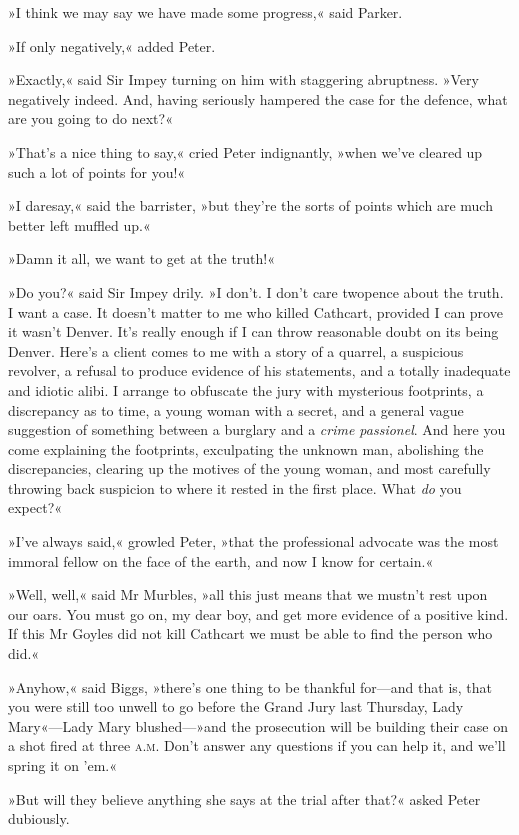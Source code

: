 »I think we may say we have made some progress,« said Parker.

»If only negatively,« added Peter.

»Exactly,« said Sir Impey turning on him with staggering abruptness.  »Very negatively indeed. And, having seriously hampered the case for the defence, what are you going to do next?«

»That's a nice thing to say,« cried Peter indignantly, »when we've cleared up such a lot of points for you!«

»I daresay,« said the barrister, »but they're the sorts of points which are much better left muffled up.«

»Damn it all, we want to get at the truth!«

»Do you?« said Sir Impey drily. »I don't. I don't care twopence about the truth. I want a case. It doesn't matter to me who killed Cathcart, provided I can prove it wasn't Denver. It's really enough if I can throw reasonable doubt on its being Denver. Here's a client comes to me with a story of a quarrel, a suspicious revolver, a refusal to produce evidence of his statements, and a totally inadequate and idiotic alibi. I arrange to obfuscate the jury with mysterious footprints, a discrepancy as to time, a young woman with a secret, and a general vague suggestion of something between a burglary and a \textit{crime passionel}. And here you come explaining the footprints, exculpating the unknown man, abolishing the discrepancies, clearing up the motives of the young woman, and most carefully throwing back suspicion to where it rested in the first place. What \textit{do} you expect?«

»I've always said,« growled Peter, »that the professional advocate was the most immoral fellow on the face of the earth, and now I know for certain.«

»Well, well,« said Mr Murbles, »all this just means that we mustn't rest upon our oars. You must go on, my dear boy, and get more evidence of a positive kind. If this Mr Goyles did not kill Cathcart we must be able to find the person who did.«

»Anyhow,« said Biggs, »there's one thing to be thankful for—and that is, that you were still too unwell to go before the Grand Jury last Thursday, Lady Mary«—Lady Mary blushed—»and the prosecution will be building their case on a shot fired at three \textsc{a.m.} Don't answer any questions if you can help it, and we'll spring it on 'em.«

»But will they believe anything she says at the trial after that?« asked Peter dubiously.

